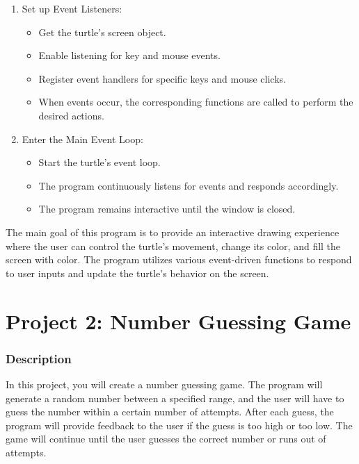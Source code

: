 \documentclass[12pt]{book}
\begin{document}
\begin{enumerate}[label=\arabic*.]
  \item Set up Event Listeners:
    \begin{itemize}
      \item Get the turtle's screen object.
      \item Enable listening for key and mouse events.
      \item Register event handlers for specific keys and mouse clicks.
      \item When events occur, the corresponding functions are called to perform the desired actions.
    \end{itemize}
  
  \item Enter the Main Event Loop:
    \begin{itemize}
      \item Start the turtle's event loop.
      \item The program continuously listens for events and responds accordingly.
      \item The program remains interactive until the window is closed.
    \end{itemize}
\end{enumerate}

The main goal of this program is to provide an interactive drawing experience where the user can control the turtle's movement, change its color, and fill the screen with color. The program utilizes various event-driven functions to respond to user inputs and update the turtle's behavior on the screen.
\newpage
\section{Project 2: Number Guessing Game}

\subsubsection{Description}
In this project, you will create a number guessing game. The program will generate a random number between a specified range, and the user will have to guess the number within a certain number of attempts. After each guess, the program will provide feedback to the user if the guess is too high or too low. The game will continue until the user guesses the correct number or runs out of attempts.
\end{document}
